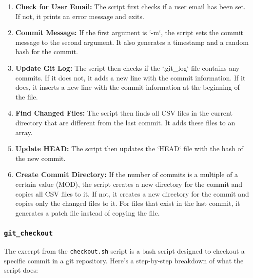 \documentclass{article}
\begin{document}
\begin{enumerate}
    \item \textbf{Check for User Email:} The script first checks if a user email has been set. If not, it prints an error message and exits.
    
    \item \textbf{Commit Message:} If the first argument is `-m`, the script sets the commit message to the second argument. It also generates a timestamp and a random hash for the commit.
    
    \item \textbf{Update Git Log:} The script then checks if the `.git\_log` file contains any commits. If it does not, it adds a new line with the commit information. If it does, it inserts a new line with the commit information at the beginning of the file.
    
    \item \textbf{Find Changed Files:} The script then finds all CSV files in the current directory that are different from the last commit. It adds these files to an array.
    
    \item \textbf{Update HEAD:} The script then updates the `HEAD` file with the hash of the new commit.
    
    \item \textbf{Create Commit Directory:} If the number of commits is a multiple of a certain value (MOD), the script creates a new directory for the commit and copies all CSV files to it. If not, it creates a new directory for the commit and copies only the changed files to it. For files that exist in the last commit, it generates a patch file instead of copying the file.
\end{enumerate}

\subsubsection{\texttt{git\_checkout}}
The excerpt from the \texttt{checkout.sh} script is a bash script designed to checkout a specific commit in a git repository. Here's a step-by-step breakdown of what the script does:
\end{document}
